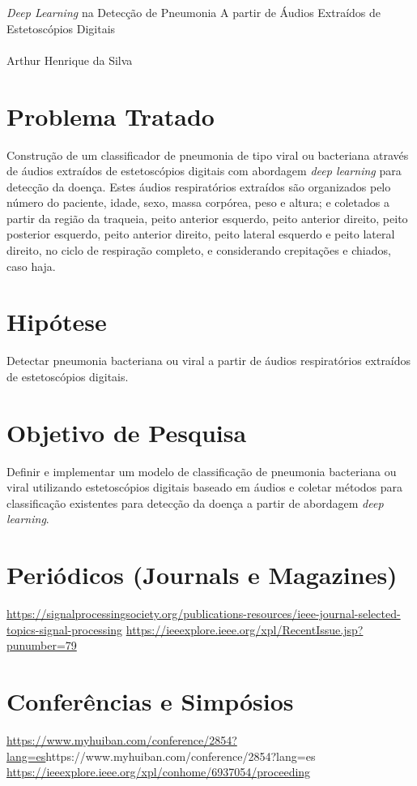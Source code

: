 \documentclass[12pt]{article}
\begin{document}
\begin{center}
{\large \textit{Deep Learning} na Detecção de Pneumonia A partir de Áudios Extraídos de Estetoscópios Digitais} \\  %
\ \\

Arthur Henrique da Silva \\


\end{center}

\section{Problema Tratado}
Construção de um classificador de pneumonia de tipo viral ou bacteriana através de áudios extraídos de estetoscópios digitais com abordagem 
\textit{deep learning} para detecção da doença. Estes áudios respiratórios extraídos são organizados pelo número do paciente, idade, sexo, massa corpórea, peso e altura; e coletados a partir da região da traqueia, peito anterior esquerdo, peito anterior direito, peito posterior esquerdo, peito anterior direito, peito lateral esquerdo e peito lateral direito, no ciclo de respiração completo, e considerando crepitações e chiados, caso haja.

\section{Hipótese}
Detectar pneumonia bacteriana ou viral a partir de áudios respiratórios extraídos de estetoscópios digitais.

\section{Objetivo de Pesquisa}

Definir e implementar um modelo de classificação de pneumonia bacteriana ou viral utilizando estetoscópios digitais baseado em áudios e coletar métodos para classificação existentes para detecção da doença a partir de abordagem \textit{deep learning}.

\section{Periódicos (Journals e Magazines)}
\url{https://signalprocessingsociety.org/publications-resources/ieee-journal-selected-topics-signal-processing}
\url{https://ieeexplore.ieee.org/xpl/RecentIssue.jsp?punumber=79}


\section{Conferências e Simpósios}

\url{https://www.myhuiban.com/conference/2854?lang=es}{https://www.myhuiban.com/conference/2854?lang=es}
\url{https://ieeexplore.ieee.org/xpl/conhome/6937054/proceeding}
\end{document}
